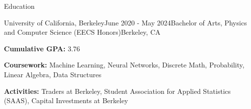 \documentclass{resume} %
\begin{document}

\begin{rSection}{Education}
    \begin{rSubsection}{University of California, Berkeley}{June 2020 - May 2024}{Bachelor of Arts, Physics and Computer Science (EECS Honors)}{Berkeley, CA}
        \item {\bf Cumulative GPA:} 3.76
        \item {\bf Coursework:} Machine Learning, Neural Networks, Discrete Math, Probability, Linear Algebra, Data Structures
        \item {\bf Activities:} Traders at Berkeley, Student Association for Applied Statistics (SAAS), Capital Investments at Berkeley
        \end{rSubsection}
    \end{rSection}

\end{document}
